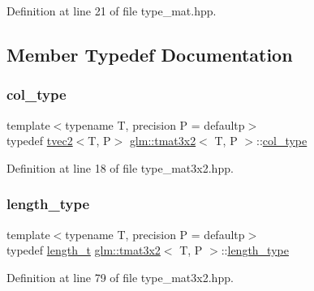 Definition at line 21 of file type\+\_\+mat.\+hpp.



\subsection{Member Typedef Documentation}
\mbox{\label{structglm_1_1tmat3x2_a341f5be67463bce97692bc232312b7e8}} 
\subsubsection{\texorpdfstring{col\_type}{col\_type}}
{\footnotesize\ttfamily template$<$typename T, precision P = defaultp$>$ \\
typedef \mbox{\hyperlink{structglm_1_1tvec2}{tvec2}}$<$T, P$>$ \mbox{\hyperlink{structglm_1_1tmat3x2}{glm\+::tmat3x2}}$<$ T, P $>$\+::\mbox{\hyperlink{structglm_1_1tmat3x2_a341f5be67463bce97692bc232312b7e8}{col\+\_\+type}}}



Definition at line 18 of file type\+\_\+mat3x2.\+hpp.

\mbox{\label{structglm_1_1tmat3x2_a358b949a615ed48c4dc18c53a55358df}} 
\subsubsection{\texorpdfstring{length\_type}{length\_type}}
{\footnotesize\ttfamily template$<$typename T, precision P = defaultp$>$ \\
typedef \mbox{\hyperlink{namespaceglm_a090a0de2260835bee80e71a702492ed9}{length\+\_\+t}} \mbox{\hyperlink{structglm_1_1tmat3x2}{glm\+::tmat3x2}}$<$ T, P $>$\+::\mbox{\hyperlink{structglm_1_1tmat3x2_a358b949a615ed48c4dc18c53a55358df}{length\+\_\+type}}}



Definition at line 79 of file type\+\_\+mat3x2.\+hpp.

\mbox{\label{structglm_1_1tmat3x2_a54b0650d908b47bb1410661d9b049d90}} 
